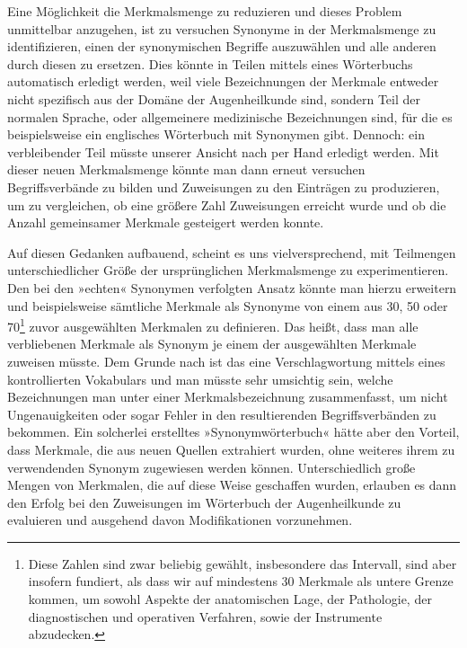 \documentclass[pagesize,DIV=calc,12pt,draft]{scrreprt}
\begin{document}
Eine Möglichkeit die Merkmalsmenge zu reduzieren und dieses Problem unmittelbar anzugehen, ist zu versuchen Synonyme in der Merkmalsmenge zu identifizieren, einen der synonymischen Begriffe auszuwählen und alle anderen durch diesen zu ersetzen.
Dies könnte in Teilen mittels eines Wörterbuchs automatisch erledigt werden, weil viele Bezeichnungen der Merkmale entweder nicht spezifisch aus der Domäne der Augenheilkunde sind, sondern Teil der normalen Sprache, oder allgemeinere medizinische Bezeichnungen sind, für die es beispielsweise ein englisches Wörterbuch mit Synonymen gibt.
Dennoch: ein verbleibender Teil müsste unserer Ansicht nach per Hand erledigt werden.
Mit dieser neuen Merkmalsmenge könnte man dann erneut versuchen Begriffsverbände zu bilden und Zuweisungen zu den Einträgen zu produzieren, um zu vergleichen, ob eine größere Zahl Zuweisungen erreicht wurde und ob die Anzahl gemeinsamer Merkmale gesteigert werden konnte.

Auf diesen Gedanken aufbauend, scheint es uns vielversprechend, mit Teilmengen unterschiedlicher Größe der ursprünglichen Merkmalsmenge zu experimentieren.
Den bei den »echten« Synonymen verfolgten Ansatz könnte man hierzu erweitern und beispielsweise sämtliche Merkmale als Synonyme von einem aus 30, 50 oder 70\footnote{Diese Zahlen sind zwar beliebig gewählt, insbesondere das Intervall, sind aber insofern fundiert, als dass wir auf mindestens 30 Merkmale als untere Grenze kommen, um sowohl Aspekte der anatomischen Lage, der Pathologie, der diagnostischen und operativen Verfahren, sowie der Instrumente abzudecken.} zuvor ausgewählten Merkmalen zu definieren.
Das heißt, dass man alle verbliebenen Merkmale als Synonym je einem der ausgewählten Merkmale zuweisen müsste.
Dem Grunde nach ist das eine Verschlagwortung mittels eines kontrollierten Vokabulars und man müsste sehr umsichtig sein, welche Bezeichnungen man unter einer Merkmalsbezeichnung zusammenfasst, um nicht Ungenauigkeiten oder sogar Fehler in den resultierenden Begriffsverbänden zu bekommen.
Ein solcherlei erstelltes »Synonymwörterbuch« hätte aber den Vorteil, dass Merkmale, die aus neuen Quellen extrahiert wurden, ohne weiteres ihrem zu verwendenden Synonym zugewiesen werden können.
Unterschiedlich große Mengen von Merkmalen, die auf diese Weise geschaffen wurden, erlauben es dann den Erfolg bei den Zuweisungen im Wörterbuch der Augenheilkunde zu evaluieren und ausgehend davon Modifikationen vorzunehmen.
\end{document}
